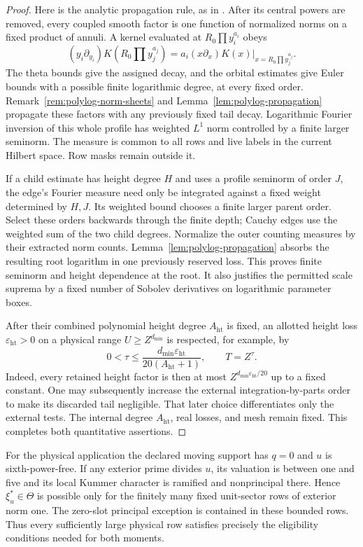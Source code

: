 \documentclass[11pt,a4paper]{article}
\numberwithin{equation}{section}
\theoremstyle{definition}
\theoremstyle{remark}
\newcommand{\eps}{\varepsilon}
\begin{document}
\begin{proof}
Here is the analytic propagation rule, as in
\cite[Lemma 17.3 and Corollary 17.4]{Q}.
After its central powers are removed, every coupled smooth
factor is one function of normalized norms on a fixed product
of annuli.  A kernel evaluated at $R_0\prod y_i^{a_i}$ obeys
\[
 (y_i\partial_{y_i})K(R_0\prod y_j^{a_j})
       =a_i(x\partial_x)K(x)\big|_{x=R_0\prod y_j^{a_j}}.
\]
  The theta bounds give the assigned decay, and the orbital estimates
give Euler bounds with a possible finite logarithmic degree, at every
fixed order.  Remark~\ref{rem:polylog-norm-sheets} and
Lemma~\ref{lem:polylog-propagation} propagate these factors with any
previously fixed tail decay.  Logarithmic Fourier
inversion of this whole profile has weighted $L^1$ norm
controlled by a finite larger seminorm.  The measure is
common to all rows and live labels in the current Hilbert
space.  Row masks remain outside it.

If a child estimate has height degree $H$ and uses a profile
seminorm of order $J$, the edge's Fourier measure need only
be integrated against a fixed weight determined by $H,J$.
Its weighted bound chooses a finite larger parent order.
Select these orders backwards through the finite depth;
Cauchy edges use the weighted sum of the two child degrees.
Normalize the outer counting measures by their extracted norm counts.
Lemma~\ref{lem:polylog-propagation} absorbs the resulting root
logarithm in one previously reserved loss.  This proves finite seminorm
and height dependence at the root.  It also justifies the permitted scale suprema by a fixed
number of Sobolev derivatives on logarithmic parameter boxes.

  After their combined polynomial height degree
$A_{\mathrm{ht}}$ is fixed, an allotted height loss
$\eps_{\mathrm{ht}}>0$ on a physical range $U\ge Z^{d_{\min}}$
is respected, for example, by
\[
 0<\tau\le
 \frac{d_{\min}\eps_{\mathrm{ht}}}{20(A_{\mathrm{ht}}+1)},
 \qquad T=Z^\tau.
\]
Indeed, every retained height factor is then at most
$Z^{d_{\min}\eps_{\mathrm{ht}}/20}$ up to a fixed constant.
One may subsequently increase the external integration-by-parts
order to make its discarded tail negligible.  That later choice
differentiates only the external tests.  The internal degree
$A_{\mathrm{ht}}$, real losses, and mesh remain fixed.
This completes both quantitative assertions.
\end{proof}

For the physical application the declared moving support has $q=0$
and $u$ is sixth-power-free.  If any exterior prime divides $u$,
its valuation is between one and five and its local Kummer
character is ramified and nonprincipal there.  Hence
$\xi_u^*\in\Theta$ is possible only for the finitely many
fixed unit-sector rows of exterior norm one.  The zero-slot
principal exception is contained in these bounded rows.
Thus every sufficiently large physical row satisfies precisely
the eligibility conditions needed for both moments.
\end{document}

